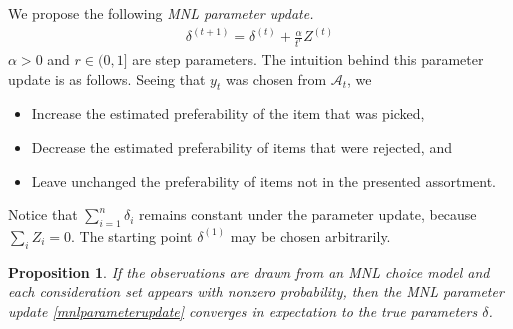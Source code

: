 \documentclass[preprint,12pt,authoryear]{elsarticle}
\newtheorem{proposition}{Proposition}
\begin{document}
We propose the following \emph{MNL parameter update.}
\begin{align} \label{mnlparameterupdate}
\delta^{(t+1)} = \delta^{(t)} + \frac{\alpha}{t^r} Z^{(t)}
\end{align}
$\alpha >0$ and $r \in (0, 1]$ are step parameters. The intuition behind this parameter update is as follows. Seeing that $y_t$ was chosen from $\mathcal{A}_t$, we 
\begin{itemize}
\item Increase the estimated preferability of the item that was picked,
\item Decrease the estimated preferability of items that were rejected, and
\item Leave unchanged the preferability of items not in the presented assortment.
\end{itemize}
Notice that $\sum_{i=1}^n \delta_i$ remains constant under the parameter update, because $\sum_i Z_i = 0$. The starting point $\delta^{(1)}$ may be chosen arbitrarily. 

\begin{proposition}\label{mnlupdateconverges} If the observations are drawn from an MNL choice model and each consideration set appears with nonzero probability, then the MNL parameter update \eqref{mnlparameterupdate} converges in expectation to the true parameters $\delta$. 
\end{proposition}

\end{document}
